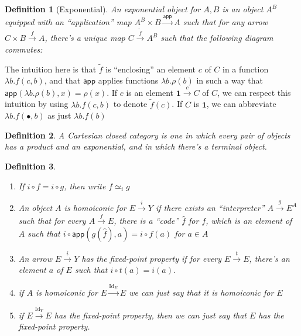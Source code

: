 \documentclass{article}
\newtheorem{definition}{Definition}
\DeclareMathOperator{\Id}{Id}
\begin{document}
\begin{definition}[Exponential]
  An exponential object for $A,B$ is an object $A^B$ equipped with an
  ``application'' map $A^B\times B \xrightarrow{\mathsf{app}} A$ such that for
  any arrow $C\times B \xrightarrow{f} A$, there's a unique map $C\xrightarrow{\tilde{f}}A^B$ such
  that the following diagram commutes:
  \begin{center}
  \end{center}
\end{definition}
The intuition here is that $\tilde{f}$ is ``enclosing'' an element $c$ of $C$ in
a function $\lambda b.f(c,b)$, and that $\mathsf{app}$ applies functions
$\lambda b. \rho(b)$ in such a way that $\mathsf{app}(\lambda b.\rho(b), x)
= \rho(x)$. If $c$ is an element $\mathbf{1}\xrightarrow{c} C$ of $C$, we can
respect this intuition by using $\lambda b.f(c,b)$ to denote $\tilde{f}(c)$. If
$C$ is $\mathbf{1}$, we can abbreviate $\lambda b.f(\bullet,b)$ as just
$\lambda b. f(b)$
\begin{definition} A Cartesian closed category is one in which every pair of
  objects has a product and an exponential, and in which there's a terminal
  object.
\end{definition}

\begin{definition}\
  \begin{enumerate}
    \item If $i\circ f = i\circ g$, then write $f\simeq_i g$
    \item An object $A$ is homoiconic for $E\xrightarrow{i}Y$ if there exists an
      ``interpreter'' $A\xrightarrow{g}E^A$ such that for every $A\xrightarrow{f} E$,
      there is a ``code'' $\hat{f}$ for $f$, which is an element of $A$ such that
      $i\circ \mathsf{app}(g(\hat{f}),a) = i\circ f(a)$
      for $a ∈ A$
    \item An arrow $E\xrightarrow{i}Y$ has the fixed-point property if for every
      $E\xrightarrow{t} E$, there's an element $a$ of $E$ such that $i\circ t(a) = i(a)$.
    \item if $A$ is homoiconic for $E\xrightarrow{\Id_E}E$ we can just say that
      it is homoiconic for $E$
    \item if $E\xrightarrow{\Id_Y} E$ has the fixed-point property, then we can
      just say that $E$ has the fixed-point property.
  \end{enumerate}
\end{definition}
\end{document}
